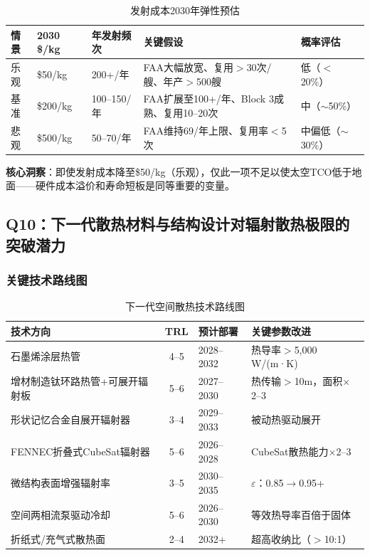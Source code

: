\begin{table}[H]
\centering
\caption{发射成本2030年弹性预估}
\label{tab:launch_2030}
\small
\begin{tabular}{lp{1.7cm}p{2.2cm}p{5.5cm}p{2.5cm}}
\toprule
\textbf{情景} & \textbf{2030 \$/kg} & \textbf{年发射频次} & \textbf{关键假设} & \textbf{概率评估} \\
\midrule
乐观 & \$50/kg & 200+/年 & FAA大幅放宽、复用$>$30次/艘、年产$>$500艘 & 低（$<$20\%） \\
基准 & \$200/kg & 100--150/年 & FAA扩展至100+/年、Block 3成熟、复用10--20次 & 中（$\sim$50\%） \\
悲观 & \$500/kg & 50--70/年 & FAA维持69/年上限、复用率$<$5次 & 中偏低（$\sim$30\%） \\
\bottomrule
\end{tabular}
\end{table}

\textbf{核心洞察}：即使发射成本降至\$50/kg（乐观），仅此一项不足以使太空TCO低于地面——硬件成本溢价和寿命短板是同等重要的变量\cite{spaceodyssey2026,exterra2026}。

\subsection{Q10：下一代散热材料与结构设计对辐射散热极限的突破潜力}

\subsubsection{关键技术路线图}

\begin{table}[H]
\centering
\caption{下一代空间散热技术路线图}
\label{tab:thermal_roadmap}
\small
\begin{tabular}{p{3.5cm}clp{4.0cm}}
\toprule
\textbf{技术方向} & \textbf{TRL} & \textbf{预计部署} & \textbf{关键参数改进} \\
\midrule
石墨烯涂层热管 & 4--5 & 2028--2032 & 热导率$>$5,000 W/(m·K)\cite{esa2017graphene,scalia2023graphene} \\
\hline
增材制造钛环路热管+可展开辐射板 & 5--6 & 2027--2030 & 热传输$>$10m，面积$\times$2--3\cite{nasa2024tfaws} \\
\hline
形状记忆合金自展开辐射器 & 3--4 & 2029--2033 & 被动热驱动展开\cite{pennstate2024sma} \\
\hline
FENNEC折叠式CubeSat辐射器 & 5--6 & 2026--2028 & CubeSat散热能力$\times$2--3\cite{esa2024fennec} \\
\hline
微结构表面增强辐射率 & 3--5 & 2030--2035 & $\varepsilon$：0.85$\rightarrow$0.95+ \\
\hline
空间两相流泵驱动冷却 & 5--6 & 2026--2030 & 等效热导率百倍于固体 \\
\hline
折纸式/充气式散热面 & 2--4 & 2032+ & 超高收纳比（$>$10:1） \\
\bottomrule
\end{tabular}
\end{table}

